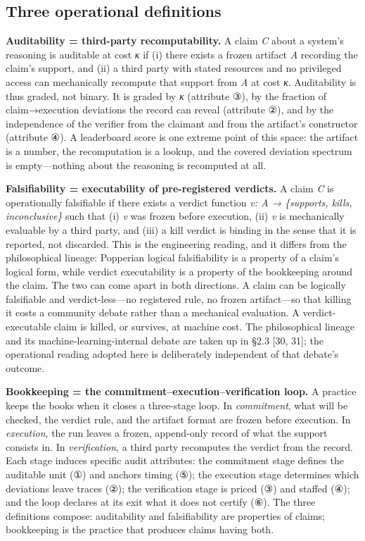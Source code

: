 \documentclass[11pt]{article}
\begin{document}
\subsection{Three operational definitions}
\noindent \textbf{Auditability = third-party recomputability.} A claim \emph{C} about a system's reasoning is auditable at cost \emph{κ} if (i) there exists a frozen artifact \emph{A} recording the claim's support, and (ii) a third party with stated resources and no privileged access can mechanically recompute that support from \emph{A} at cost \emph{κ}. Auditability is thus graded, not binary. It is graded by \emph{κ} (attribute ③), by the fraction of claim→execution deviations the record can reveal (attribute ②), and by the independence of the verifier from the claimant and from the artifact's constructor (attribute ④). A leaderboard score is one extreme point of this space: the artifact is a number, the recomputation is a lookup, and the covered deviation spectrum is empty—nothing about the reasoning is recomputed at all.\par
\noindent \textbf{Falsifiability = executability of pre-registered verdicts.} A claim \emph{C} is operationally falsifiable if there exists a verdict function \emph{v: A → \{supports, kills, inconclusive\}} such that (i) \emph{v} was frozen before execution, (ii) \emph{v} is mechanically evaluable by a third party, and (iii) a kill verdict is binding in the sense that it is reported, not discarded. This is the engineering reading, and it differs from the philosophical lineage: Popperian logical falsifiability is a property of a claim's logical form, while verdict executability is a property of the bookkeeping around the claim. The two can come apart in both directions. A claim can be logically falsifiable and verdict-less—no registered rule, no frozen artifact—so that killing it costs a community debate rather than a mechanical evaluation. A verdict-executable claim is killed, or survives, at machine cost. The philosophical lineage and its machine-learning-internal debate are taken up in §2.3 [30, 31]; the operational reading adopted here is deliberately independent of that debate's outcome.\par
\noindent \textbf{Bookkeeping = the commitment–execution–verification loop.} A practice keeps the books when it closes a three-stage loop. In \emph{commitment}, what will be checked, the verdict rule, and the artifact format are frozen before execution. In \emph{execution}, the run leaves a frozen, append-only record of what the support consists in. In \emph{verification}, a third party recomputes the verdict from the record. Each stage induces specific audit attributes: the commitment stage defines the auditable unit (①) and anchors timing (⑤); the execution stage determines which deviations leave traces (②); the verification stage is priced (③) and staffed (④); and the loop declares at its exit what it does not certify (⑥). The three definitions compose: auditability and falsifiability are properties of claims; bookkeeping is the practice that produces claims having both.\par
\end{document}

